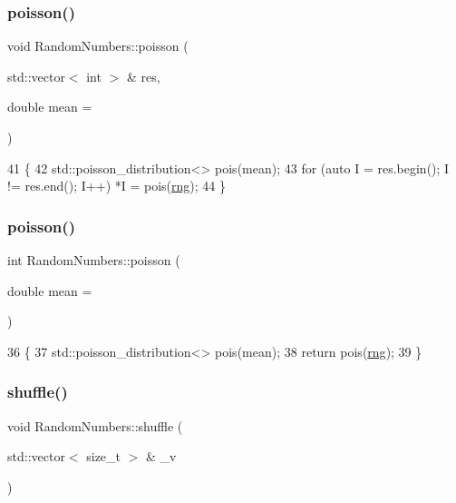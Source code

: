 \subsubsection{\texorpdfstring{poisson()}{poisson()}\hspace{0.1cm}{\footnotesize\ttfamily [1/2]}}
{\footnotesize\ttfamily void Random\+Numbers\+::poisson (\begin{DoxyParamCaption}\item[{std\+::vector$<$ int $>$ \&}]{res,  }\item[{double}]{mean = {} }\end{DoxyParamCaption})}


\begin{DoxyCode}
41                                                             \{
42     std::poisson\_distribution<> pois(mean);
43     \textcolor{keywordflow}{for} (\textcolor{keyword}{auto} I = res.begin(); I != res.end(); I++) *I = pois(\mbox{\hyperlink{classRandomNumbers_a15ceee85d6d00de12ae76c90aaec2f14}{rng}});
44 \}
\end{DoxyCode}
\mbox{\label{classRandomNumbers_ac5bd95dddabde62a74a0d871a66ce2f0}} 
\subsubsection{\texorpdfstring{poisson()}{poisson()}\hspace{0.1cm}{\footnotesize\ttfamily [2/2]}}
{\footnotesize\ttfamily int Random\+Numbers\+::poisson (\begin{DoxyParamCaption}\item[{double}]{mean = {} }\end{DoxyParamCaption})}


\begin{DoxyCode}
36                                       \{
37     std::poisson\_distribution<> pois(mean);
38     \textcolor{keywordflow}{return} pois(\mbox{\hyperlink{classRandomNumbers_a15ceee85d6d00de12ae76c90aaec2f14}{rng}});
39 \}
\end{DoxyCode}
\mbox{\label{classRandomNumbers_a851aaa7e46922dc22ce984b21b474a4e}} 
\subsubsection{\texorpdfstring{shuffle()}{shuffle()}}
{\footnotesize\ttfamily void Random\+Numbers\+::shuffle (\begin{DoxyParamCaption}\item[{std\+::vector$<$ size\+\_\+t $>$ \&}]{\+\_\+v }\end{DoxyParamCaption})\hspace{0.3cm}{\ttfamily [inline]}}


